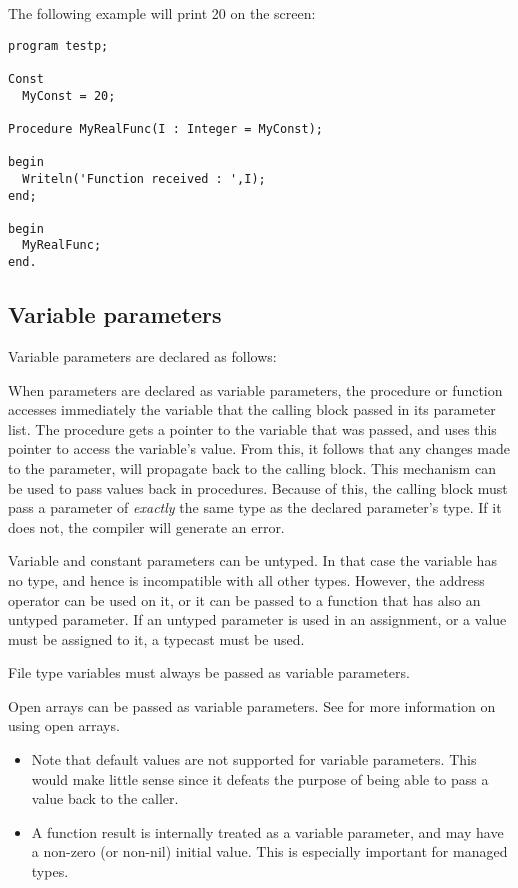 The following example will print 20 on the screen:
\begin{verbatim}
program testp;

Const
  MyConst = 20;

Procedure MyRealFunc(I : Integer = MyConst);

begin
  Writeln('Function received : ',I);
end;

begin
  MyRealFunc;
end.
\end{verbatim}

\subsection{Variable parameters}
\label{se:varparams}
Variable parameters are declared as follows:

When parameters are declared as variable parameters, the procedure or
function accesses immediately the variable that the calling block passed in
its parameter list. The procedure gets a pointer to the variable that was
passed, and uses this pointer to access the variable's value.
From this, it follows that any changes made to the parameter, will
propagate back to the calling block. This mechanism can be used to pass
values back in procedures.
Because of this, the calling block must pass a parameter of {\em exactly}
the same type as the declared parameter's type. If it does not, the compiler
will generate an error.

Variable and constant parameters can be untyped. In that case the variable has no type,
and hence is incompatible with all other types. However, the address operator
can be used on it, or it can be passed to a function that has also an
untyped parameter. If an untyped parameter is used in an assignment,
or a value must be assigned to it, a typecast must be used.

File type variables must always be passed as variable parameters.

Open arrays can be passed as variable parameters. See  for
more information on using open arrays.

\begin{remark}
\begin{itemize}
\item Note that default values are not supported for variable parameters. This
would make little sense since it defeats the purpose of being able to pass a
value back to the caller.
\item A function result is internally treated as a variable parameter, and
may have a non-zero (or non-nil) initial value. This is especially important
for managed types.
\end{itemize}
\end{remark}



